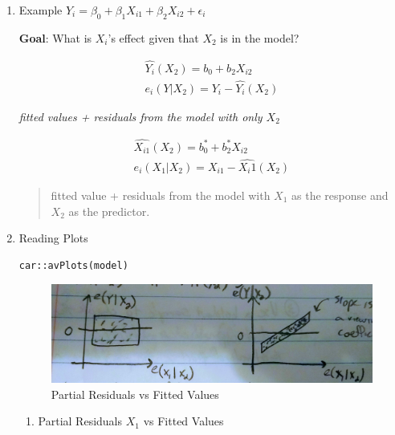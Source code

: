 \documentclass[11pt]{article}
\begin{document}
\begin{enumerate}
\item Example
\label{sec:org504a9cc}
\(Y_i = \beta_0 + \beta_1 X_{i1} + \beta_2 X_{i2} + \epsilon_i\)

\textbf{Goal}: What is \(X_i\)'s effect given that \(X_2\) is in the model?

\begin{equation}
\begin{split}
\hat{Y_i}(X_2) = b_0 + b_2 X_{i2}\\
e_i(Y | X_2) = Y_i - \hat{Y_i}(X_2)
\end{split}
\end{equation}

\emph{fitted values + residuals from the model with only \(X_2\)}

\begin{equation}
\begin{split}
\hat{X_{i1}}(X_2) = b_0^* + b_2^* X_{i2}\\
e_i(X_1 | X_2) = X_{i1} - \hat{X_i1} (X_2)
\end{split}
\end{equation}

\begin{quote}
fitted value + residuals from the model with \(X_1\) as the response and \(X_2\) as
the predictor.
\end{quote}

\item Reading Plots
\label{sec:org339fe31}

\begin{verbatim}
car::avPlots(model)
\end{verbatim}

\begin{figure}[htbp]
\centering
\includegraphics[width=.9\linewidth]{./images/avPlots.jpg}
\caption{\label{fig:org803e96f}
Partial Residuals vs Fitted Values}
\end{figure}

\begin{enumerate}
\item Partial Residuals \(X_1\) vs Fitted Values


\end{enumerate}
\end{enumerate}
\end{document}
